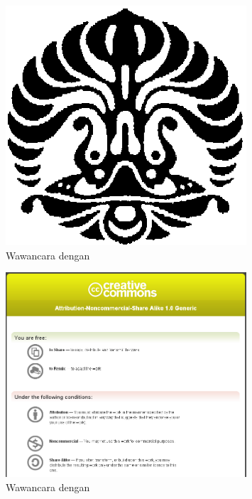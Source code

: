 \begin{appendix}
     \begin{figure}[H]
      \centering
        \includegraphics[width=0.8\textwidth]{assets/pics/makara.png}
        \caption*{Wawancara dengan \narsumSatu}
     \end{figure}

     \begin{figure}[H]
      \centering
        \includegraphics[width=0.8\textwidth]{assets/pics/creative_commons.png}
        \caption*{Wawancara dengan \narsumDua}
     \end{figure}
    \newpage


    
    \clearpage
\end{appendix}
